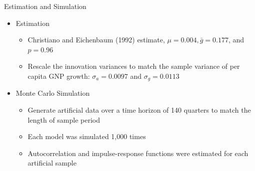 \documentclass[10pt]{beamer}
\begin{document}
		      		\begin{frame}{Estimation and Simulation}
		      			\begin{itemize}
		      				\item Estimation
		      				      \begin{itemize}
		      				      	\item Christiano and Eichenbaum (1992) estimate, $\mu = 0.004, \bar{g} = 0.177$, and
		      				      	      $p = 0.96$
		      				      	\item Rescale the innovation variances to match the sample variance of per capita GNP
		      				      	      growth: $\sigma_a = 0.0097$ and $\sigma_g = 0.0113$
		      				      \end{itemize}
		      				\item Monte Carlo Simulation
		      				      \begin{itemize}
		      				      	\item Generate artificial data over a time horizon of 140 quarters to match the
		      				      	      length of sample period
		      				      	\item Each model was simulated 1,000 times
		      				      	\item Autocorrelation and impulse-response functions were estimated for each
		      				      	      artificial sample
		      				      \end{itemize}
		      				      
		      			\end{itemize}
		      		\end{frame}
		      		
\end{document}
